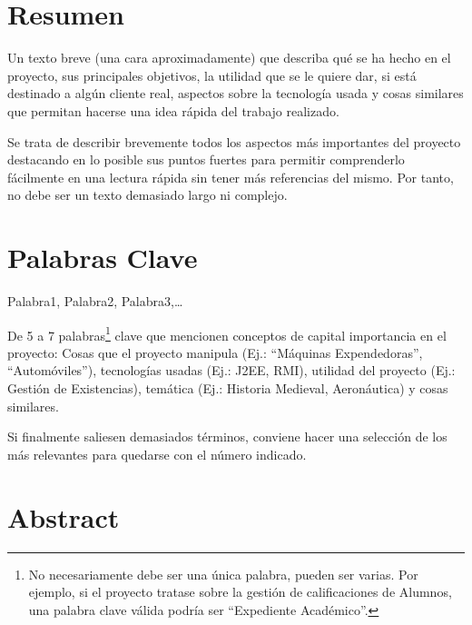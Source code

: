 \documentclass[11pt]{book}
\begin{document}
\newpage
\thispagestyle{empty}
\mbox{} 

\newpage
\thispagestyle{empty}

\section*{Resumen}

Un texto breve (una cara aproximadamente) que describa qué se ha hecho en el proyecto, sus principales objetivos, la utilidad que se le quiere dar, si está destinado a algún cliente real, aspectos sobre la tecnología usada y cosas similares que permitan hacerse una idea rápida del trabajo realizado. 

Se trata de describir brevemente todos los aspectos más importantes del proyecto destacando en lo posible sus puntos fuertes para permitir comprenderlo fácilmente en una lectura rápida sin tener más referencias del mismo. Por tanto, no debe ser un texto demasiado largo ni complejo.

\newpage
\thispagestyle{empty}
\mbox{}

\newpage
\thispagestyle{empty}
\section*{Palabras Clave}

Palabra1, Palabra2, Palabra3,\dots 

\mbox{}
\mbox{}

\noindent De 5 a 7 palabras\footnote{No necesariamente debe ser una única palabra, pueden ser varias. Por ejemplo, si el proyecto tratase sobre la gestión de calificaciones de Alumnos, una palabra clave válida podría ser ``Expediente Académico''.} clave que mencionen conceptos de capital importancia en el proyecto: Cosas que el proyecto manipula (Ej.: ``Máquinas Expendedoras'', ``Automóviles''), tecnologías usadas (Ej.: J2EE, RMI), utilidad del proyecto (Ej.: Gestión de Existencias), temática (Ej.: Historia Medieval, Aeronáutica) y cosas similares.

\noindent Si finalmente saliesen demasiados términos, conviene hacer una selección de los más relevantes para quedarse con el número indicado. 

\newpage
\thispagestyle{empty}
\mbox{}

\newpage
\thispagestyle{empty}
\section*{Abstract}
\end{document}
